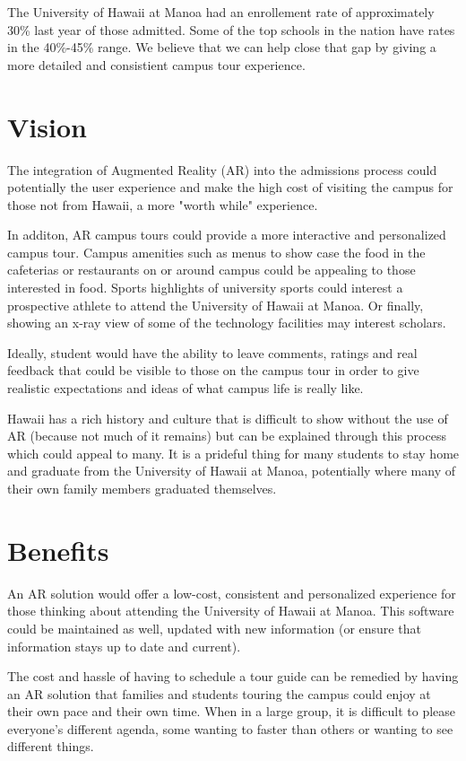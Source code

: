 \documentclass[titlepage]{article}
\begin{document}
The University of Hawaii at Manoa had an enrollement rate of approximately 30\% last year of those admitted. Some of the top schools in the nation have rates in the 40\%-45\% range. We believe that we can help close that gap by giving a more detailed and consistient campus tour experience. 

\section*{Vision}

The integration of Augmented Reality (AR) into the admissions process could potentially the user experience and make the high cost of visiting the campus for those not from Hawaii, a more "worth while" experience.

In additon, AR campus tours could provide a more interactive and personalized campus tour. Campus amenities such as menus to show case the food in the cafeterias or restaurants on  or around campus could be appealing to those interested in food. Sports highlights of university sports could interest a prospective athlete to attend the University of Hawaii at Manoa. Or finally, showing an x-ray view of some of the technology facilities may interest scholars. 

Ideally, student would have the ability to leave comments, ratings and real feedback that could be visible to those on the campus tour in order to give realistic expectations and ideas of what campus life is really like.

Hawaii has a rich history and culture that is difficult to show without the use of AR (because not much of it remains) but can be explained through this process which could appeal to many. It is a prideful thing for many students to stay home and graduate from the University of Hawaii at Manoa, potentially where many of their own family members graduated themselves.

\section*{Benefits}

An AR solution would offer a low-cost, consistent and personalized experience for those thinking about attending the University of Hawaii at Manoa. This software could be maintained as well, updated with new information (or ensure that information stays up to date and current).

The cost and hassle of having to schedule a tour guide can be remedied by having an AR solution that families and students touring the campus could enjoy at their own pace and their own time. When in a large group, it is difficult to please everyone's different agenda, some wanting to faster than others or wanting to see different things.
\end{document}
